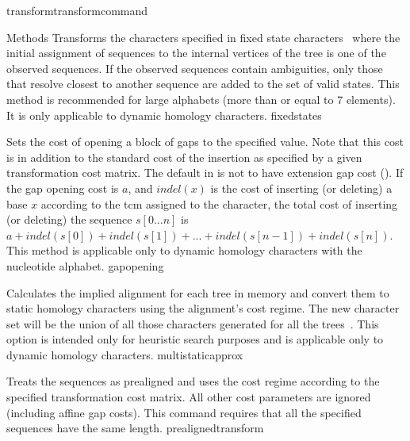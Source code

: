 \begin{command}{transform}{transformcommand}
\begin{arguments}
\begin{argumentgroup}{Methods}
          {Transforms the characters specified in fixed state characters~\cite{wheeler1999a}
          where the initial assignment of sequences to the internal vertices of
          the tree is one of the observed sequences. If the observed sequences
          contain ambiguities, only those that resolve closest to another
          sequence are added to the set of valid states. This method is
          recommended for large alphabets (more than or equal to 7 elements). It is only
          applicable to dynamic homology characters.}
          {fixedstates}
          
            {Sets the cost of opening a block of gaps to the specified value. Note that
            this cost is in addition to the standard cost of the insertion as
            specified by a given transformation cost matrix.
            The default in \poy is not to have extension
            gap cost (). If the gap
            opening cost is
            $a$, and $indel(x)$ is the cost of inserting (or deleting) a
            base $x$ according to the tcm assigned to the character, the total
            cost of inserting (or deleting) the sequence $s[0...n]$ is $a +
            indel(s[0]) + indel(s[1]) + ... + indel(s[n - 1]) + indel(s[n]).$
            This method is applicable only to dynamic homology characters with
            the nucleotide alphabet.} 
            {gapopening}

            {Calculates the implied alignment for each tree in memory
            and convert them to static homology characters using the alignment's
            cost regime. The new character set will be the union of all those
            characters generated for all the trees~\cite{wheeler1995a}. This option is intended only
            for heuristic search purposes and is applicable only to dynamic homology characters.}
            {multistaticapprox}

                {Treats the sequences as prealigned and uses the
                cost regime according to the specified transformation cost
                matrix. All other cost parameters are ignored (including affine
                gap costs). This command requires that all the specified sequences have the same length.}
                {prealignedtransform}
            

\end{argumentgroup}
\end{arguments}
\end{command}
